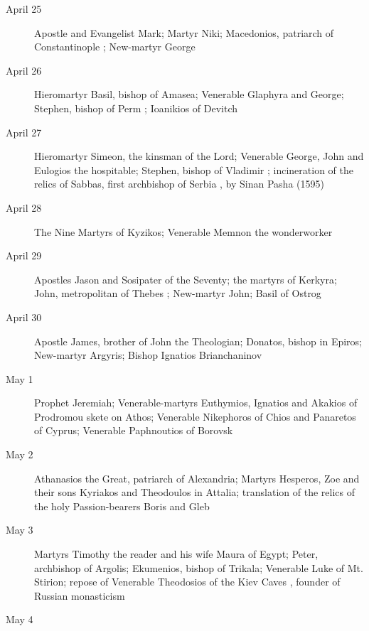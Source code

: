 \begin{description}
\item[April 25]

Apostle and Evangelist Mark; Martyr Niki; Macedonios, patriarch of Constantinople ; New-martyr George

\item[April 26]

Hieromartyr Basil, bishop of Amasea; Venerable Glaphyra and George; Stephen, bishop of Perm ; Ioanikios of Devitch

\item[April 27]

Hieromartyr Simeon, the kinsman of the Lord; Venerable George, John and Eulogios the hospitable; Stephen, bishop of Vladimir ; incineration of the relics of Sabbas, first archbishop of Serbia , by Sinan Pasha (1595)

\item[April 28]

The Nine Martyrs of Kyzikos; Venerable Memnon the wonderworker

\item[April 29]

Apostles Jason and Sosipater of the Seventy; the martyrs of Kerkyra; John, metropolitan of Thebes ; New-martyr John; Basil of Ostrog

\item[April 30]

Apostle James, brother of John the Theologian; Donatos, bishop in Epiros; New-martyr Argyris; Bishop Ignatios Brianchaninov

\item[May 1]

Prophet Jeremiah; Venerable-martyrs Euthymios, Ignatios and Akakios of Prodromou skete on Athos; Venerable Nikephoros of Chios and Panaretos of Cyprus; Venerable Paphnoutios of Borovsk

\item[May 2]

Athanasios the Great, patriarch of Alexandria; Martyrs Hesperos, Zoe and their sons Kyriakos and Theodoulos in Attalia; translation of the relics of the holy Passion-bearers Boris and Gleb

\item[May 3]

Martyrs Timothy the reader and his wife Maura of Egypt; Peter, archbishop of Argolis; Ekumenios, bishop of Trikala; Venerable Luke of Mt. Stirion; repose of Venerable Theodosios of the Kiev Caves , founder of Russian monasticism

\item[May 4]


\end{description}
